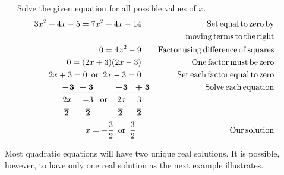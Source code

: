 \begin{example}~~~Solve the given equation for all possible values of $x$.
  \begin{eqnarray*}
    3 x^2 + 4 x - 5 = 7 x^2 + 4 x - 14~~~ &  & \operatorname{Set} \operatorname{equal} \operatorname{to}
    \operatorname{zero} \operatorname{by}\\
		&&~~~\operatorname{moving} \operatorname{terms} \operatorname{to} \operatorname{the} \operatorname{right}\\
    0 = 4 x^2 - 9~~~ &  & \operatorname{Factor} \operatorname{using} \operatorname{difference} \operatorname{of}
    \operatorname{squares}\\
    0 = (2 x + 3) (2 x - 3)~~~ &  & \operatorname{One} \operatorname{factor} \operatorname{must}
    \operatorname{be} \operatorname{zero}\\
    2 x + 3 = 0 \operatorname{~or~} 2 x - 3 = 0~~~ &  & \operatorname{Set} \operatorname{each}
    \operatorname{factor} \operatorname{equal} \operatorname{to} \operatorname{zero}\\
    \boldsymbol{\underline{- 3 ~- 3} ~~~~~~~~ \underline{+ 3 ~~+ 3}} &  & \operatorname{Solve} \operatorname{each}
    \operatorname{equation}\\
    2 x = - 3 \operatorname{~~or~~~} 2 x = 3~~~ &  	& \\
    \boldsymbol{\overline{2} ~~~~~~ \overline{2} ~~~~~~~~~~ \overline{2} ~~~~~ \overline{2}}~~~ &  & \\
    x = -\frac{3}{2} \operatorname{~or~} \frac{3}{2}~~~~~ &  & \operatorname{Our} \operatorname{solution}
  \end{eqnarray*}
\end{example}

Most quadratic equations will have two unique real solutions. It is
possible, however, to have only one real solution as the next example illustrates.

